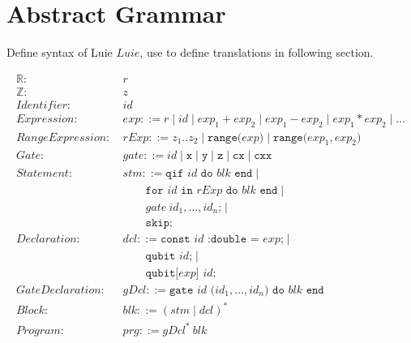 \section{Abstract Grammar}
\label{sec:concept_abstractGrammar}
Define syntax of Luie $Luie$, use to define translations in following section.

\begin{align*}
    \mathbb{R}: \ & r \\
    \mathbb{Z}: \ & z \\
    Identifier: \ & id \\
    Expression: \ & exp ::= r \mid id \mid exp_1 + exp_2 \mid exp_1 - exp_2 \mid exp_1 * exp_2 \mid \dots\\
    RangeExpression: \ & rExp ::= z_1 .. z_2 \mid \texttt{range(} exp \texttt{)} \mid \texttt{range(} exp_1, exp_2 \texttt{)}\\
    Gate: \ & gate ::= id \mid \texttt{x} \mid \texttt{y} \mid \texttt{z} \mid \texttt{cx} \mid \texttt{cxx}\\
    Statement: \ & stm ::= \texttt{qif } id \texttt{ do }  blk \texttt{ end} \mid \\
               & \quad \quad \texttt{for } id \texttt{ in } rExp \texttt{ do } blk \texttt{ end} \mid \\
               & \quad \quad gate \ id_1, \dots, id_n \texttt{;} \mid \\
               & \quad \quad \texttt{skip;}\\
    Declaration: \ & dcl ::= \texttt{const } id \texttt{ :double = } exp \texttt{;} \mid \\
                 & \quad \quad \texttt{qubit } id \texttt{;} \mid \\
                 & \quad \quad \texttt{qubit[} exp \texttt{] } id \texttt{;}\\
    GateDeclaration: \ & gDcl::= \texttt{gate } id \texttt{ (}id_1, \dots, id_n\texttt{) do } blk \texttt{ end}\\
    Block: \ & blk::= (stm \mid dcl)^*\\
    Program: \ & prg ::= gDcl^* \ blk 
\end{align*}